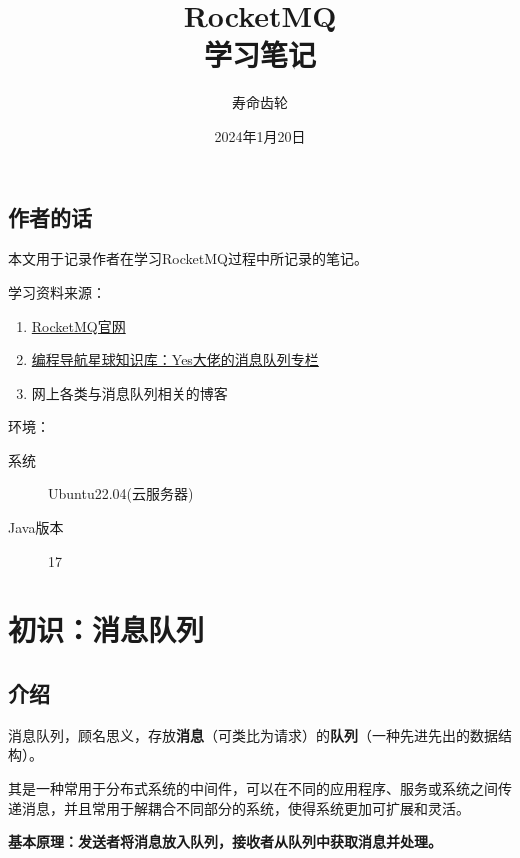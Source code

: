 \documentclass[11pt, a4paper, oneside, fontset=none]{ctexbook}
\title{{\Huge{\textbf{RocketMQ}}}\\学习笔记}
\author{寿命齿轮}
\date{2024年1月20日}
\begin{document}
\maketitle

\newpage                    %
\setcounter{page}{1}        %
\section*{作者的话}
本文用于记录作者在学习RocketMQ过程中所记录的笔记。

学习资料来源：
\begin{enumerate}
  \item \href{https://rocketmq.apache.org/zh/}{RocketMQ官网}
  \item \href{https://wx.zsxq.com/dweb2/index/footprint/544814425818214}{编程导航星球知识库：Yes大佬的消息队列专栏}
  \item 网上各类与消息队列相关的博客
\end{enumerate}

环境：
\begin{description}
  \item[系统] Ubuntu22.04(云服务器)
  \item[Java版本] 17
\end{description}

\newpage                    %
\setcounter{page}{1}        %
\tableofcontents            %

\newpage                    %
\setcounter{page}{1}        %

\chapter{初识：消息队列}
\section{介绍}
消息队列，顾名思义，存放\textbf{消息}（可类比为请求）的\textbf{队列}（一种先进先出的数据结构）。

其是一种常用于分布式系统的中间件，可以在不同的应用程序、服务或系统之间传递消息，并且常用于解耦合不同部分的系统，使得系统更加可扩展和灵活。

{\bfseries\kaishu 基本原理：发送者将消息放入队列，接收者从队列中获取消息并处理。}
\end{document}

